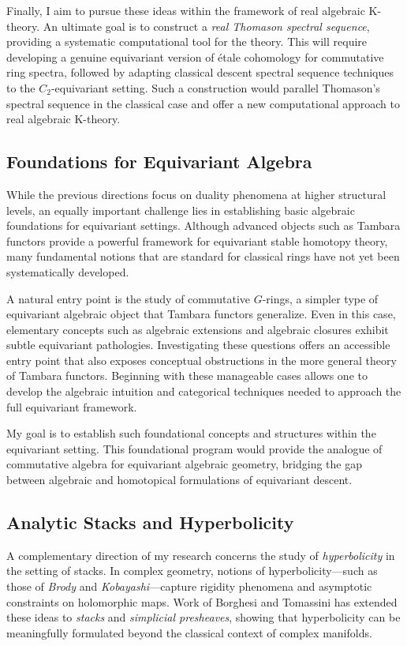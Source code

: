 \documentclass[11pt]{article}
\begin{document}
Finally, I aim to pursue these ideas within the framework of real algebraic K-theory.
An ultimate goal is to construct a {\it real Thomason spectral sequence}, providing a systematic computational tool for the theory.
This will require developing a genuine equivariant version of \'etale cohomology for commutative ring spectra, followed by adapting classical descent spectral sequence techniques to the $C_2$-equivariant setting.
Such a construction would parallel Thomason’s spectral sequence in the classical case and offer a new computational approach to real algebraic K-theory.


\subsection*{Foundations for Equivariant Algebra}
While the previous directions focus on duality phenomena at higher structural levels, an equally important challenge lies in establishing basic algebraic foundations for equivariant settings.
Although advanced objects such as Tambara functors provide a powerful framework for equivariant stable homotopy theory, many fundamental notions that are standard for classical rings have not yet been systematically developed.

A natural entry point is the study of commutative $G$-rings, a simpler type of equivariant algebraic object that Tambara functors generalize.
Even in this case, elementary concepts such as algebraic extensions and algebraic closures exhibit subtle equivariant pathologies.
Investigating these questions offers an accessible entry point that also exposes conceptual obstructions in the more general theory of Tambara functors.
Beginning with these manageable cases allows one to develop the algebraic intuition and categorical techniques needed to approach the full equivariant framework.

My goal is to establish such foundational concepts and structures within the equivariant setting.
This foundational program would provide the analogue of commutative algebra for equivariant algebraic geometry, bridging the gap between algebraic and homotopical formulations of equivariant descent.


\subsection*{Analytic Stacks and Hyperbolicity}
A complementary direction of my research concerns the study of {\it hyperbolicity} in the setting of stacks.
In complex geometry, notions of hyperbolicity—such as those of {\it Brody} and {\it Kobayashi}—capture rigidity phenomena and asymptotic constraints on holomorphic maps.
Work of Borghesi and Tomassini \cite{MR3673667} has extended these ideas to {\it stacks} and {\it simplicial presheaves}, showing that hyperbolicity can be meaningfully formulated beyond the classical context of complex manifolds.
\end{document}
